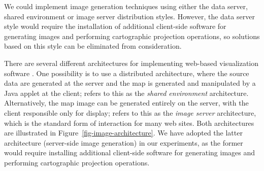 \documentclass[acmtocl,acmnow]{acmtrans2m}
\begin{document}

We could implement image generation techniques using either the data
server, shared environment or image server distribution styles. However,
the data server style would require the installation of additional
client-side software for generating images and performing cartographic
projection operations, so solutions based on this style can be eliminated
from consideration. 

There are several different architectures for implementing web-based
visualization software \cite{Wood-J-1996-vis,MacE-AM-1998-GIS}. One possibility is
to use a distributed architecture, where the source data are
generated at the server and the map is generated and manipulated by a
Java applet at the client;  refers to this as
the \emph{shared environment} architecture. Alternatively, the map image
can be generated entirely on the server, with the client responsible
only for display;  refers to this as the
\emph{image server} architecture, which is the standard form of
interaction for many web sites. Both architectures are illustrated in
Figure~\ref{fig-image-architecture}. We have adopted the latter
architecture (server-side image generation) in our experiments, as the
former would require installing additional client-side software for
generating images and performing cartographic projection operations.


\end{document}
